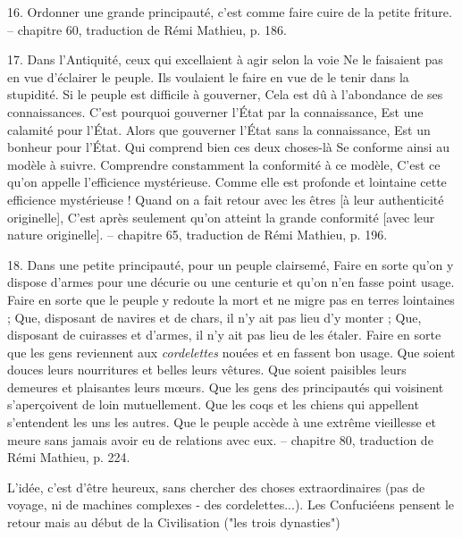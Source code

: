 \begin{singlequote}
    16.	Ordonner une grande principauté, c’est comme faire cuire de la petite friture.
-- chapitre 60, traduction de Rémi Mathieu, p. 186.
\end{singlequote}

\begin{singlequote}
    17.	Dans l’Antiquité, ceux qui excellaient à agir selon la voie Ne le faisaient pas en vue d’éclairer le peuple.
Ils voulaient le faire en vue de le tenir dans la stupidité. Si le peuple est difficile à gouverner,
Cela est dû à l’abondance de ses connaissances. C’est pourquoi gouverner l’État par la connaissance, Est une calamité pour l’État.
Alors que gouverner l’État sans la connaissance, Est un bonheur pour l’État.
Qui comprend bien ces deux choses-là Se conforme ainsi au modèle à suivre.
Comprendre constamment la conformité à ce modèle, C’est ce qu’on appelle l’efficience mystérieuse.
Comme elle est profonde et lointaine cette efficience mystérieuse ! Quand on a fait retour avec les êtres [à leur authenticité originelle],
C’est après seulement qu’on atteint la grande conformité [avec leur nature originelle].
-- chapitre 65, traduction de Rémi Mathieu, p. 196.
\end{singlequote}

 \begin{singlequote}
    18.	Dans une petite principauté, pour un peuple clairsemé,
Faire en sorte qu’on y dispose d’armes pour une décurie ou une centurie et qu’on n’en fasse point usage.
Faire en sorte que le peuple y redoute la mort et ne migre pas en terres lointaines ; Que, disposant de navires et de chars, il n’y ait pas lieu d’y monter ;
Que, disposant de cuirasses et d’armes, il n’y ait pas lieu de les étaler.
Faire en sorte que les gens reviennent aux \textit{cordelettes} nouées et en fassent bon usage. Que soient douces leurs nourritures et belles leurs vêtures.
Que soient paisibles leurs demeures et plaisantes leurs mœurs.
Que les gens des principautés qui voisinent s’aperçoivent de loin mutuellement. Que les coqs et les chiens qui appellent s’entendent les uns les autres.
Que le peuple accède à une extrême vieillesse et meure sans jamais avoir eu de relations avec eux.
-- chapitre 80, traduction de Rémi Mathieu, p. 224.
\end{singlequote}

L'idée, c'est d'être heureux, sans chercher des choses extraordinaires (pas de voyage, ni de machines complexes - des cordelettes...).
Les Confuciéens pensent le retour mais au début de la Civilisation ("les trois dynasties")

